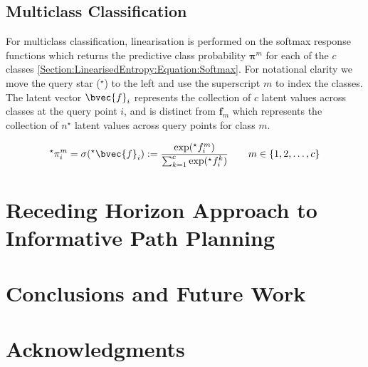 \documentclass{article}
\renewcommand{\vec}[1]{\boldsymbol{#1}}
\begin{document}
	\subsection{Multiclass Classification}
	
		For multiclass classification, linearisation is performed on the softmax response functions which returns the predictive class probability $\vec{\pi}^{m}$ for each of the $c$ classes \eqref{Section:LinearisedEntropy:Equation:Softmax}. For notational clarity we move the query star ($^\star$) to the left and use the superscript $m$ to index the classes. The latent vector $\bvec{f}_{i}$ represents the collection of $c$ latent values across classes at the query point $i$, and is distinct from $\vec{f}_{m}$ which represents the collection of $n^{\star}$ latent values across query points for class $m$.

		\begin{equation}
			^{\star}\pi^{m}_{i} = \sigma(^{\star}\bvec{f}_{i}) := \frac{\exp(^{\star}f^{m}_{i})}{\sum_{k = 1}^{c} \exp(^{\star}f^{k}_{i})} \qquad m \in \{1, 2, \dots, c\}
		\label{Section:LinearisedEntropy:Equation:Softmax}
		\end{equation}	
					
\section{Receding Horizon Approach to Informative Path Planning}
\label{Section:RecedingHorizonApproach}

\section{Conclusions and Future Work}
\label{Section:Conclusion}

\section*{Acknowledgments}


%
%



\end{document}
